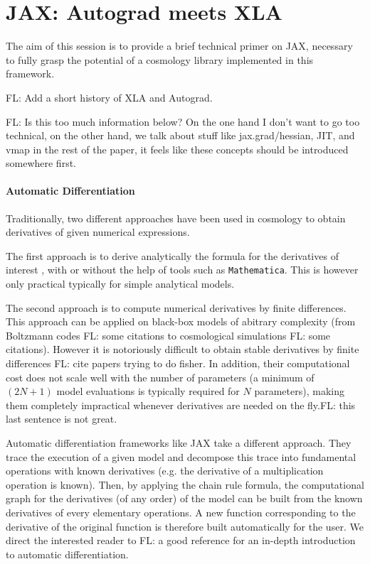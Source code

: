 \documentclass[twocolumn,twocolappendix,nofootinbib,iop]{openjournal}
\newcommand{\FrL}[1]{{\color{cyan}FL: #1}}
\begin{document}
\section{JAX: Autograd meets XLA}
\label{sec-primer}

The aim of this session is to provide a brief technical primer on JAX, necessary to fully grasp the potential of a cosmology library implemented in this framework.

\FrL{Add a short history of XLA and Autograd.}


\FrL{Is this too much information below? On the one hand I don't want to go too technical, on the other hand, we talk about stuff like jax.grad/hessian, JIT, and vmap in the rest of the paper, it feels like these concepts should be introduced somewhere first.}

\paragraph{Automatic Differentiation} Traditionally, two different approaches have been used in cosmology to obtain derivatives of given numerical expressions.

The first approach is to derive analytically the formula for the derivatives of interest \citep{BORG}, with or without the help of tools such as \texttt{Mathematica}. This is however only practical typically for simple analytical models.

The second approach is to compute numerical derivatives by finite differences. This approach can be applied on black-box models of abitrary complexity (from Boltzmann codes \FrL{some citations} to cosmological simulations \FrL{some citations}). However it is notoriously difficult to obtain stable derivatives by finite differences \FrL{cite papers trying to do fisher}. In addition, their computational cost does not scale well with the number of parameters (a minimum of $(2N+1)$ model evaluations is typically required for $N$ parameters), making them completely impractical whenever derivatives are needed on the fly.\FrL{this last sentence is not great.}

Automatic differentiation frameworks like JAX take a different approach. They trace the execution of a given model and decompose this trace into fundamental operations with known derivatives (e.g. the derivative of a multiplication operation is known). Then, by applying the chain rule formula, the computational graph for the derivatives (of any order) of the model can be built from the known derivatives of every elementary operations. A new function corresponding to the derivative of the original function is therefore built automatically for the user. We direct the interested reader to \FrL{a good reference} for an in-depth introduction to automatic differentiation. 
\end{document}
